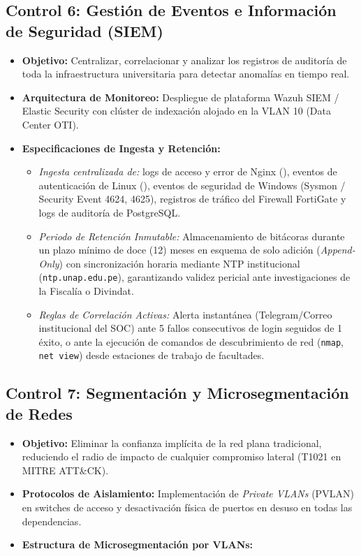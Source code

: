 \subsection{Control 6: Gestión de Eventos e Información de Seguridad (SIEM)}

\begin{itemize}
    \item \textbf{Objetivo:} Centralizar, correlacionar y analizar los registros de auditoría de toda la infraestructura universitaria para detectar anomalías en tiempo real.
    \item \textbf{Arquitectura de Monitoreo:} Despliegue de plataforma Wazuh SIEM / Elastic Security con clúster de indexación alojado en la VLAN 10 (Data Center OTI).
    \item \textbf{Especificaciones de Ingesta y Retención:}
    \begin{itemize}
        \item \textit{Ingesta centralizada de:} logs de acceso y error de Nginx (), eventos de autenticación de Linux (), eventos de seguridad de Windows (Sysmon / Security Event 4624, 4625), registros de tráfico del Firewall FortiGate y logs de auditoría de PostgreSQL.
        \item \textit{Periodo de Retención Inmutable:} Almacenamiento de bitácoras durante un plazo mínimo de doce (12) meses en esquema de solo adición (\textit{Append-Only}) con sincronización horaria mediante NTP institucional (\texttt{ntp.unap.edu.pe}), garantizando validez pericial ante investigaciones de la Fiscalía o Divindat.
        \item \textit{Reglas de Correlación Activas:} Alerta instantánea (Telegram/Correo institucional del SOC) ante 5 fallos consecutivos de login seguidos de 1 éxito, o ante la ejecución de comandos de descubrimiento de red (\texttt{nmap}, \texttt{net view}) desde estaciones de trabajo de facultades.
    \end{itemize}
\end{itemize}

\newpage
\subsection{Control 7: Segmentación y Microsegmentación de Redes}

\begin{itemize}
    \item \textbf{Objetivo:} Eliminar la confianza implícita de la red plana tradicional, reduciendo el radio de impacto de cualquier compromiso lateral (T1021 en MITRE ATT\&CK).
    \item \textbf{Protocolos de Aislamiento:} Implementación de \textit{Private VLANs} (PVLAN) en switches de acceso y desactivación física de puertos en desuso en todas las dependencias.
    \item \textbf{Estructura de Microsegmentación por VLANs:}
\end{itemize}

